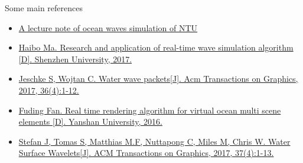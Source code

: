 \documentclass{beamer}
\begin{document}
\begin{frame}{Some main references}
      \begin{itemize}
        \item<1-> \href{http://w3.oc.ntu.edu.tw/chap7/chap7s2.htm}{A lecture note of ocean waves simulation of NTU} 
        \item<2-> \href{http://cdmd.cnki.com.cn/Article/CDMD-10590-1017812561.htm}{Haibo Ma. Research and application of real-time wave simulation algorithm [D]. Shenzhen University, 2017.}
        \item<3-> \href{http://pub.ist.ac.at/group_wojtan/projects/2017_Jeschke_WaterWavePackets/wavepackets_author.pdf}{Jeschke S, Wojtan C. Water wave packets[J]. Acm Transactions on Graphics, 2017, 36(4):1-12.}
        \item<4-> \href{http://kns.cnki.net/KCMS/detail/detail.aspx?dbcode=CMFDanddbname=CMFD201701andfilename=1016765176.nhanduid=WEEvREcwSlJHSldRa1FhcTdWajFtZkFNbGZQYWkvYUlrbXkvUjdZRGJhST0=$9A4hF_YAuvQ5obgVAqNKPCYcEjKensW4ggI8Fm4gTkoUKaID8j8gFw!!andv=MzE2NjJDVVJMS2ZZZWRuRkNqaFZyektWRjI2R0xTK0c5RExxWkViUElSOGVYMUx1eFlTN0RoMVQzcVRyV00xRnI=}{Fuding Fan. Real time rendering algorithm for virtual ocean multi scene elements [D]. Yanshan University, 2016.}
        \item<5-> \href{http://visualcomputing.ist.ac.at/publications/2018/WSW/}{Stefan J, Tomas S, Matthias M.F, Nuttapong C, Miles M, Chris W. Water Surface Wavelets[J]. ACM Transactions on Graphics, 2017, 37(4):1-13.}  
      \end{itemize}
\end{frame}
\end{document}
